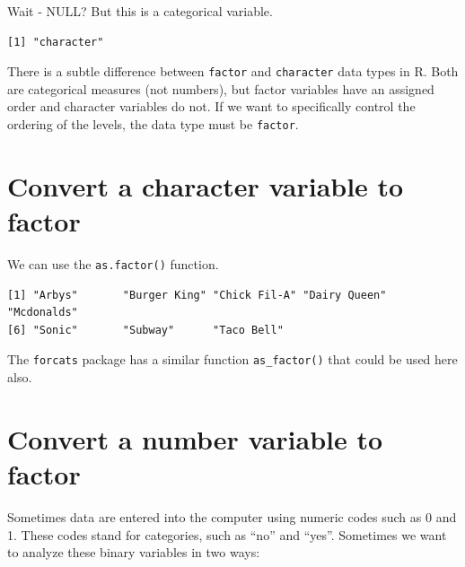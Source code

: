 \documentclass[
  letterpaper,
  DIV=11,
  numbers=noendperiod,
  oneside]{scrreprt}
\newenvironment{Shaded}{\begin{snugshade}}{\end{snugshade}}
\newcommand{\FunctionTok}[1]{\textcolor[rgb]{0.28,0.35,0.67}{#1}}
\newcommand{\NormalTok}[1]{\textcolor[rgb]{0.00,0.23,0.31}{#1}}
\newcommand{\OtherTok}[1]{\textcolor[rgb]{0.00,0.23,0.31}{#1}}
\newcommand{\SpecialCharTok}[1]{\textcolor[rgb]{0.37,0.37,0.37}{#1}}
\begin{document}
Wait - NULL? But this is a categorical variable.

\begin{Shaded}
\end{Shaded}

\begin{verbatim}
[1] "character"
\end{verbatim}

There is a subtle difference between \texttt{factor} and
\texttt{character} data types in R. Both are categorical measures (not
numbers), but factor variables have an assigned order and character
variables do not. If we want to specifically control the ordering of the
levels, the data type must be \texttt{factor}.

\section{Convert a character variable to
factor}\label{convert-a-character-variable-to-factor}

We can use the \texttt{as.factor()} function.

\begin{Shaded}
\end{Shaded}

\begin{verbatim}
[1] "Arbys"       "Burger King" "Chick Fil-A" "Dairy Queen" "Mcdonalds"  
[6] "Sonic"       "Subway"      "Taco Bell"  
\end{verbatim}

The \texttt{forcats} package has a similar function
\texttt{as\_factor()} that could be used here also.

\section{Convert a number variable to
factor}\label{convert-a-number-variable-to-factor}

Sometimes data are entered into the computer using numeric codes such as
0 and 1. These codes stand for categories, such as ``no'' and ``yes''.
Sometimes we want to analyze these binary variables in two ways:
\end{document}
